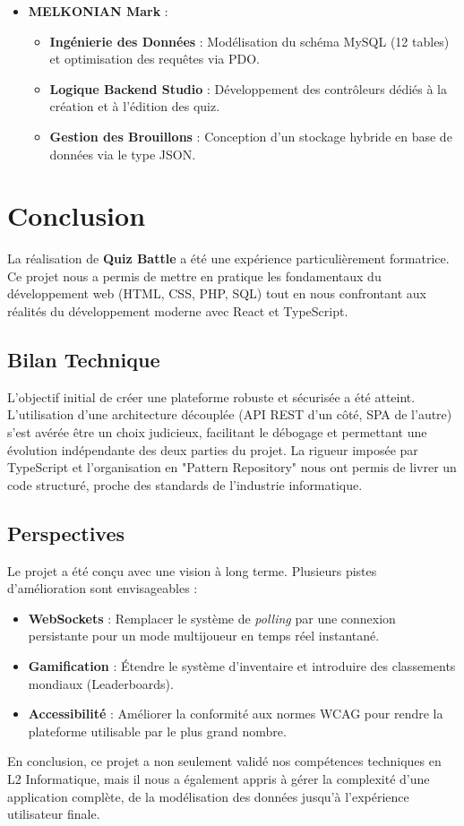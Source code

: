 \documentclass[12pt,a4paper]{article}
\begin{document}
\begin{itemize}
    \item \textbf{MELKONIAN Mark} : 
    \begin{itemize}
        \item \textbf{Ingénierie des Données} : Modélisation du schéma MySQL (12 tables) et optimisation des requêtes via PDO.
        \item \textbf{Logique Backend Studio} : Développement des contrôleurs dédiés à la création et à l'édition des quiz.
        \item \textbf{Gestion des Brouillons} : Conception d'un stockage hybride en base de données via le type JSON.
    \end{itemize}
\end{itemize}

\section{Conclusion}

La réalisation de \textbf{Quiz Battle} a été une expérience particulièrement formatrice. Ce projet nous a permis de mettre en pratique les fondamentaux du développement web (HTML, CSS, PHP, SQL) tout en nous confrontant aux réalités du développement moderne avec React et TypeScript.

\subsection{Bilan Technique}
L'objectif initial de créer une plateforme robuste et sécurisée a été atteint. L'utilisation d'une architecture découplée (API REST d'un côté, SPA de l'autre) s'est avérée être un choix judicieux, facilitant le débogage et permettant une évolution indépendante des deux parties du projet. La rigueur imposée par TypeScript et l'organisation en "Pattern Repository" nous ont permis de livrer un code structuré, proche des standards de l'industrie informatique.

\subsection{Perspectives}
Le projet a été conçu avec une vision à long terme. Plusieurs pistes d'amélioration sont envisageables :
\begin{itemize}
    \item \textbf{WebSockets} : Remplacer le système de \textit{polling} par une connexion persistante pour un mode multijoueur en temps réel instantané.
    \item \textbf{Gamification} : Étendre le système d'inventaire et introduire des classements mondiaux (Leaderboards).
    \item \textbf{Accessibilité} : Améliorer la conformité aux normes WCAG pour rendre la plateforme utilisable par le plus grand nombre.
\end{itemize}

En conclusion, ce projet a non seulement validé nos compétences techniques en L2 Informatique, mais il nous a également appris à gérer la complexité d'une application complète, de la modélisation des données jusqu'à l'expérience utilisateur finale.
\end{document}
